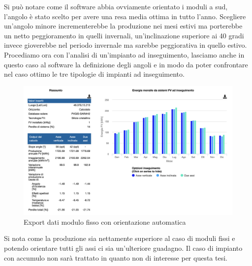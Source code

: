 Si può notare come il software abbia ovviamente orientato i moduli a sud, l'angolo è stato scelto per avere una resa media ottima in tutto l'anno.
Scegliere un'angolo minore incrementerebbe la produzione nei mesi estivi ma porterebbe un netto peggioramento in quelli invernali, un'inclinazione superiore ai 40 gradi invece gioverebbe nel periodo invernale ma sarebbe peggiorativa in quello estivo.
Procediamo ora con l'analisi di un'impianto ad inseguimento, lasciamo anche in questo caso al software la definizione degli angoli e in modo da poter confrontare nel caso ottimo le tre tipologie di impianti ad inseguimento.
\begin{figure}[H]
    \centering
    \includegraphics[height=0.6\textwidth]{res/cap 4/inseguimento uniud-auto}
    \caption{Export dati modulo fisso con orientazione automatica}
\end{figure}\noindent
Si nota come la produzione sia nettamente superiore al caso di moduli fissi e potendo orientare tutti gli assi ci sia un'ulteriore guadagno.
Il caso di impianto con accumulo non sarà trattato in quanto non di interesse per questa tesi.
